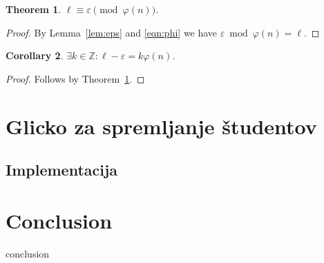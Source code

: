 \documentclass{IEEEtran}
\makeatletter
\newcommand{\Z}{\ensuremath{\mathbb Z}}
\let\old@subsection\subsection
\renewcommand{\subsection}[1]{\bigskip\old@subsection{#1}\@afterindentfalse\@afterheading}
\newtheorem{theorem}{Theorem}[section]
\newtheorem{corollary}[theorem]{Corollary}
\makeatother
\begin{document}
\begin{theorem} \label{thm:equiv}
$\ell \equiv \varepsilon \pmod{\varphi(n)}$.
\end{theorem}

\begin{proof}
By Lemma~\ref{lem:eps} and \eqref{eqn:phi} we have $\varepsilon \bmod{\varphi(n)} = \ell$.
\end{proof}

\begin{corollary} \label{cor:mult}
$\exists k \in \Z: \ell - \varepsilon = k \varphi(n)$.
\end{corollary}

\begin{proof}
Follows by Theorem~\ref{thm:equiv}.
\end{proof}

\section{Glicko za spremljanje študentov}


\subsection{Implementacija}

\section{Conclusion}
\label{sec:cnc}
conclusion



\end{document}
